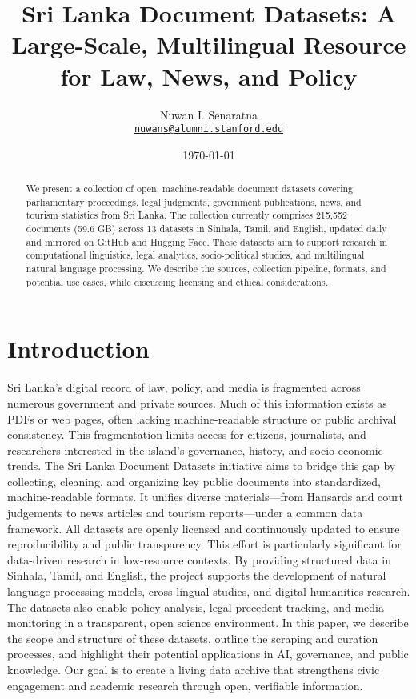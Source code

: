 \documentclass[11pt,a4paper,twocolumn]{article}%
\title{Sri Lanka Document Datasets: A Large{-}Scale, Multilingual Resource for Law, News, and Policy}%
\author{Nuwan I. Senaratna\\\vspace{0.25em}\texttt{\href{mailto:nuwans@alumni.stanford.edu}{nuwans@alumni.stanford.edu}}}%
\date{\today}%
\begin{document}
%
\normalsize%
\maketitle%
\begin{abstract}%
We present a collection of open, machine{-}readable document datasets covering parliamentary proceedings, legal judgments, government publications, news, and tourism statistics from Sri Lanka.  The collection currently comprises 215,552 documents (59.6 GB) across 13 datasets in Sinhala, Tamil, and English, updated daily and mirrored on GitHub and Hugging Face.  These datasets aim to support research in computational linguistics, legal analytics, socio{-}political studies, and multilingual natural language processing.  We describe the sources, collection pipeline, formats, and potential use cases, while discussing licensing and ethical considerations.%
\newline%
\newline%
\end{abstract}%
\section{Introduction}%
\label{sec:Introduction}%
Sri Lanka’s digital record of law, policy, and media is fragmented across numerous government and private sources. Much of this information exists as PDFs or web pages, often lacking machine{-}readable structure or public archival consistency. This fragmentation limits access for citizens, journalists, and researchers interested in the island’s governance, history, and socio{-}economic trends.%
\newline%
\newline%
The Sri Lanka Document Datasets initiative aims to bridge this gap by collecting, cleaning, and organizing key public documents into standardized, machine{-}readable formats. It unifies diverse materials—from Hansards and court judgements to news articles and tourism reports—under a common data framework. All datasets are openly licensed and continuously updated to ensure reproducibility and public transparency.%
\newline%
\newline%
This effort is particularly significant for data{-}driven research in low{-}resource contexts. By providing structured data in Sinhala, Tamil, and English, the project supports the development of natural language processing models, cross{-}lingual studies, and digital humanities research. The datasets also enable policy analysis, legal precedent tracking, and media monitoring in a transparent, open science environment.%
\newline%
\newline%
In this paper, we describe the scope and structure of these datasets, outline the scraping and curation processes, and highlight their potential applications in AI, governance, and public knowledge. Our goal is to create a living data archive that strengthens civic engagement and academic research through open, verifiable information.%
\newline%
\newline
\end{document}
